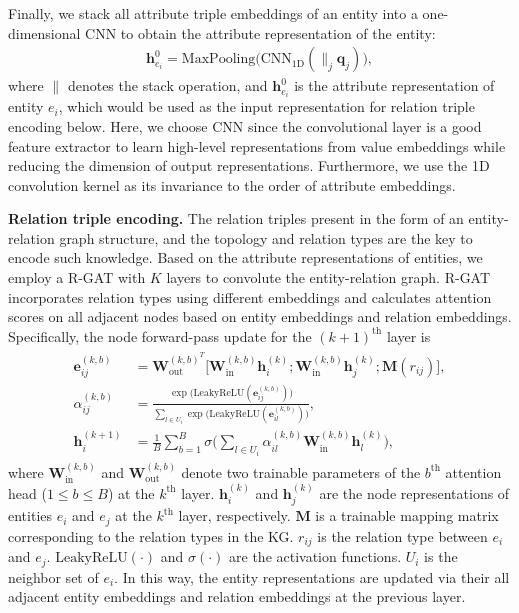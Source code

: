 \documentclass[runningheads]{llncs}
\begin{document}
Finally, we stack all attribute triple embeddings of an entity into a one-dimensional CNN to obtain the attribute representation of the entity:
\begin{align}
    \mathbf{h}_{e_i}^{0} = \mathrm{MaxPooling} \big(\mathrm{CNN_{1D}} (\parallel_j \mathbf{q}_j)\big),
\end{align}
where $\parallel$ denotes the stack operation, and $\mathbf{h}_{e_i}^{0}$ is the attribute representation of entity $e_i$, which would be used as the input representation for relation triple encoding below. Here, we choose CNN since the convolutional layer is a good feature extractor to learn high-level representations from value embeddings while reducing the dimension of output representations. 
Furthermore, we use the 1D convolution kernel as its invariance to the order of attribute embeddings. 

\textbf{Relation triple encoding.}
The relation triples present in the form of an entity-relation graph structure, and the topology and relation types are the key to encode such knowledge.
Based on the attribute representations of entities, we employ a R-GAT \cite{busbrige2019relational} with $K$ layers to convolute the entity-relation graph. 
R-GAT incorporates relation types using different embeddings and calculates attention scores on all adjacent nodes based on entity embeddings and relation embeddings.
Specifically, the node forward-pass update for the $(k+1)^\text{th}$ layer is
\begin{align}
\begin{aligned}
	\mathbf{e}_{ij}^{(k,b)} &= \mathbf{W}_\text{out}^{(k,b)^{T}} \big[\mathbf{W}_\text{in}^{(k,b)} \mathbf{h}_i^{(k)} ; \mathbf{W}_\text{in}^{(k,b)} \mathbf{h}_j^{(k)} ; \mathbf{M}(r_{ij})\big],\\
	\alpha_{ij}^{(k,b)} &= \frac{\exp \big(\mathrm{LeakyReLU} ( \mathbf{e}_{ij}^{(k,b)})\big)} {\sum_{l \in U_i} \exp \big(\mathrm{LeakyReLU} ( \mathbf{e}_{il}^{(k,b)})\big)}, \\
	\mathbf{h}_i^{(k+1)} &= \frac{1}{B}\sum_{b=1}^B \sigma \Big(\sum_{l \in U_i} \alpha_{il}^{(k,b)} \mathbf{W}_\text{in}^{(k,b)} \mathbf{h}_l^{(k)}\Big),
\end{aligned}
\end{align}
where $\mathbf{W}_\text{in}^{(k, b)}$ and $\mathbf{W}_\text{out}^{(k,b)}$ denote two trainable parameters of the $b^\text{th}$ attention head ($1\le b\le B$) at the $k^\text{th}$ layer. 
$\mathbf{h}_i^{(k)}$ and $\mathbf{h}_j^{(k)}$ are the node representations of entities $e_i$ and $e_j$ at the $k^\text{th}$ layer, respectively. 
$\mathbf{M}$ is a trainable mapping matrix corresponding to the relation types in the KG. 
$r_{ij}$ is the relation type between $e_i$ and $e_j$. 
$\mathrm{LeakyReLU}(\cdot)$ and $\sigma(\cdot)$ are the activation functions. 
$U_i$ is the neighbor set of $e_i$. In this way, the entity representations are updated via their all adjacent entity embeddings and relation embeddings at the previous layer.
\end{document}
